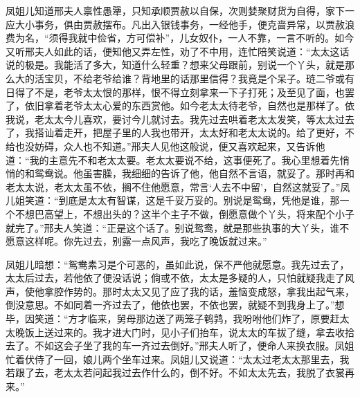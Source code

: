 凤姐儿知道邢夫人禀性愚犟，只知承顺贾赦以自保，次则婪聚财货为自得，家下一应大小事务，俱由贾赦摆布。凡出入银钱事务，一经他手，便克啬异常，以贾赦浪费为名，``须得我就中俭省，方可偿补''，儿女奴仆，一人不靠，一言不听的。如今又听邢夫人如此的话，便知他又弄左性，劝了不中用，连忙陪笑说道：``太太这话说的极是。我能活了多大，知道什么轻重？想来父母跟前，别说一个丫头，就是那么大的活宝贝，不给老爷给谁？背地里的话那里信得？我竟是个呆子。琏二爷或有日得了不是，老爷太太恨的那样，恨不得立刻拿来一下子打死；及至见了面，也罢了，依旧拿着老爷太太心爱的东西赏他。如今老太太待老爷，自然也是那样了。依我说，老太太今儿喜欢，要讨今儿就讨去。我先过去哄着老太太发笑，等太太过去了，我搭讪着走开，把屋子里的人我也带开，太太好和老太太说的。给了更好，不给也没妨碍，众人也不知道。''邢夫人见他这般说，便又喜欢起来，又告诉他道：``我的主意先不和老太太要。老太太要说不给，这事便死了。我心里想着先悄悄的和鸳鸯说。他虽害臊，我细细的告诉了他，他自然不言语，就妥了。那时再和老太太说，老太太虽不依，搁不住他愿意，常言`人去不中留'，自然这就妥了。''凤儿姐笑道：``到底是太太有智谋，这是千妥万妥的。别说是鸳鸯，凭他是谁，那一个不想巴高望上，不想出头的？这半个主子不做，倒愿意做个丫头，将来配个小子就完了。''邢夫人笑道：``正是这个话了。别说鸳鸯，就是那些执事的大丫头，谁不愿意这样呢。你先过去，别露一点风声，我吃了晚饭就过来。''

凤姐儿暗想：``鸳鸯素习是个可恶的，虽如此说，保不严他就愿意。我先过去了，太太后过去，若他依了便没话说；倘或不依，太太是多疑的人，只怕就疑我走了风声，使他拿腔作势的。那时太太又见了应了我的话，羞恼变成怒，拿我出起气来，倒没意思。不如同着一齐过去了，他依也罢，不依也罢，就疑不到我身上了。''想毕，因笑道：``方才临来，舅母那边送了两笼子鹌鹑，我吩咐他们炸了，原要赶太太晚饭上送过来的。我才进大门时，见小子们抬车，说太太的车拔了缝，拿去收拾去了。不如这会子坐了我的车一齐过去倒好。''邢夫人听了，便命人来换衣服。凤姐忙着伏侍了一回，娘儿两个坐车过来。凤姐儿又说道：``太太过老太太那里去，我若跟了去，老太太若问起我过去作什么的，倒不好。不如太太先去，我脱了衣裳再来。''

